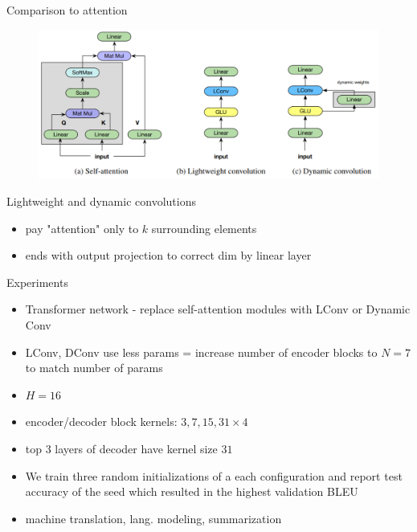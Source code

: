 \documentclass{beamer}
\begin{document}
\begin{frame}{Comparison to attention}

\begin{figure}[h]
\includegraphics[width=1.0\textwidth]{img/attention}
\end{figure}


Lightweight and dynamic  convolutions
\begin{itemize}
\item pay "attention" only to $k$ surrounding elements
\item ends with output projection to correct dim by linear layer

\end{itemize}

\end{frame}
\begin{frame}{Experiments}

\begin{itemize}
\item Transformer network - replace self-attention modules with LConv or Dynamic Conv
\item LConv, DConv use less params = increase number of encoder blocks to $N = 7$ to match number of params
\item $H = 16$
\item encoder/decoder block kernels: $3, 7, 15, 31 \times 4$
\item top 3 layers of decoder have kernel size $31$
\item We train three random initializations of a each configuration and report test accuracy of the seed
which resulted in the highest validation BLEU
\item machine translation, lang. modeling, summarization
\end{itemize}

\end{frame}
\end{document}
